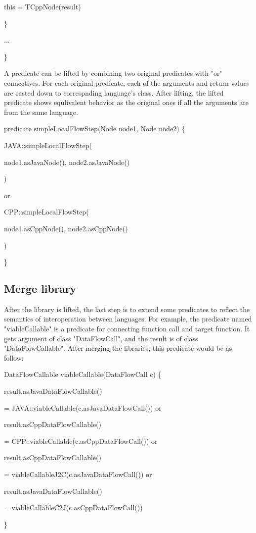     this = TCppNode(result)
  
  \}
  
  ...

\}

A predicate can be lifted by combining two original predicates with "or" connectives.
For each original predicate, each of the arguments and return values are casted down to
correspnding language's class. After lifting, the lifted predicate shows equlivalent behavior
as the original ones if all the arguments are from the same language.

predicate simpleLocalFlowStep(Node node1, Node node2) \{
  
  JAVA::simpleLocalFlowStep(
    
    node1.asJavaNode(), node2.asJavaNode()

  )
  
  or
  
  CPP::simpleLocalFlowStep(

    node1.asCppNode(), node2.asCppNode()

  )

\}

\subsection{Merge library}

After the library is lifted, the last step is to extend some predicates to reflect the
semantics of interoperation between languages. For example, the predicate named "viableCallable"
is a predicate for connecting function call and target function. It gets argument of class "DataFlowCall",
and the result is of class "DataFlowCallable". After merging the libraries, this predicate would be as follow:

DataFlowCallable viableCallable(DataFlowCall c) \{

result.asJavaDataFlowCallable()

  = JAVA::viableCallable(c.asJavaDataFlowCall()) or

result.asCppDataFlowCallable()

  = CPP::viableCallable(c.asCppDataFlowCall()) or

result.asCppDataFlowCallable()

  = viableCallableJ2C(c.asJavaDataFlowCall()) or

result.asJavaDataFlowCallable()

  = viableCallableC2J(c.asCppDataFlowCall())

\}

